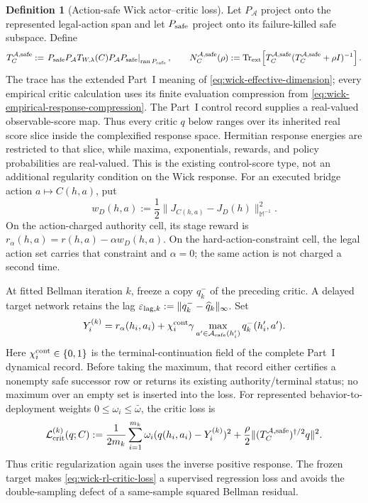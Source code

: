 \documentclass[11pt]{article}
\numberwithin{section}{part}
\theoremstyle{plain}
\theoremstyle{definition}
\newtheorem{definition}[definition]{Definition}
\theoremstyle{remark}
\begin{document}
\begin{definition}[Action-safe Wick actor--critic loss]
\label{def:wick-rl-training-loss}
Let \(P_{\mathcal A}\) project onto the represented legal-action span and
let \(P_{\rm safe}\) project onto its failure-killed safe subspace.  Define
\begin{equation}
 \label{eq:wick-action-safe-kernel}
 T_C^{\mathcal A,{\rm safe}}
 :=\left.P_{\rm safe}P_{\mathcal A}T_{W,\lambda}(C)
 P_{\mathcal A}P_{\rm safe}\right|_{\operatorname{ran}P_{\rm safe}},
 \qquad
 N_C^{\mathcal A,{\rm safe}}(\rho)
 :=\operatorname{Tr}_{\rm ext}\!\left[
 T_C^{\mathcal A,{\rm safe}}
 (T_C^{\mathcal A,{\rm safe}}+\rho I)^{-1}\right].
\end{equation}
The trace has the extended Part~I meaning of
\eqref{eq:wick-effective-dimension}; every empirical critic calculation uses
its finite evaluation compression from
\eqref{eq:wick-empirical-response-compression}.
The Part~I control record supplies a real-valued observable-score map.  Thus
every critic \(q\) below ranges over its inherited real score slice inside the
complexified response space.  Hermitian response energies are restricted to
that slice, while maxima, exponentials, rewards, and policy probabilities are
real-valued.  This is the existing control-score type, not an additional
regularity condition on the Wick response.
For an executed bridge action \(a\mapsto C(h,a)\), put
\[
 w_D(h,a):=\frac12
 \|J_{C(h,a)}-J_D(h)\|_{\mathbb M^{-1}}^2.
\]
On the action-charged authority cell, its stage reward is
\(r_\alpha(h,a)=r(h,a)-\alpha w_D(h,a)\).  On the hard-action-constraint
cell, the legal action set carries that constraint and \(\alpha=0\); the
same action is not charged a second time.

At fitted Bellman iteration \(k\), freeze a copy \(q_k^-\) of the preceding
critic.  A delayed target network retains the lag
\(\varepsilon_{{\rm lag},k}:=\|q_k^--\widehat q_k\|_\infty\).  Set
\begin{equation}
 \label{eq:wick-fitted-bellman-target}
 Y_i^{(k)}
 =r_\alpha(h_i,a_i)
 +\chi_i^{\rm cont}\gamma
  \max_{a'\in\mathcal A_{\rm safe}(h_i')}
 q_k^-(h_i',a').
\end{equation}
Here \(\chi_i^{\rm cont}\in\{0,1\}\) is the terminal-continuation field of
the complete Part~I dynamical record.  Before taking the maximum, that record
either certifies a nonempty safe successor row or returns its existing
authority/terminal status; no maximum over an empty set is inserted into the
loss.
For represented behavior-to-deployment weights \(0\le\omega_i\le\bar\omega\),
the critic loss is
\begin{equation}
 \label{eq:wick-rl-critic-loss}
 \mathcal L_{\rm crit}^{(k)}(q;C)
 :=\frac1{2m_k}\sum_{i=1}^{m_k}\omega_i
 (q(h_i,a_i)-Y_i^{(k)})^2
 +\frac\rho2
 \|(T_C^{\mathcal A,{\rm safe}})^{\dagger/2}q\|^2.
\end{equation}
Thus critic regularization again uses the inverse positive response.  The
frozen target makes \eqref{eq:wick-rl-critic-loss} a supervised regression
loss and avoids the double-sampling defect of a same-sample squared Bellman
residual.


\end{definition}
\end{document}
